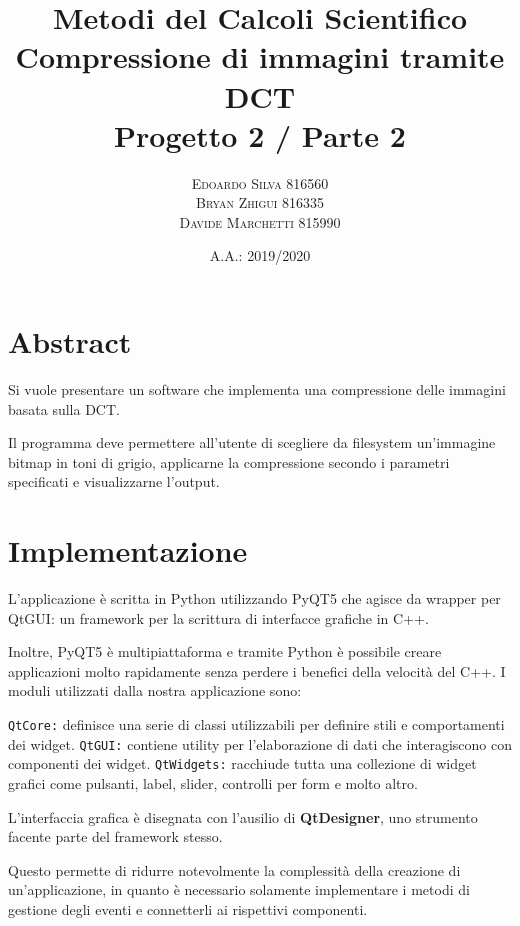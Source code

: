 \documentclass[11pt,italian]{article}
\title{
    Metodi del Calcoli Scientifico \\
    \normalsize Compressione di immagini tramite DCT \\
    \normalsize Progetto 2 / Parte 2
}
\date{A.A.: 2019/2020}
\author{
    \normalsize
    \textsc{Edoardo Silva 816560} \\
    \normalsize
    \textsc{Bryan Zhigui 816335} \\
    \normalsize
    \textsc{Davide Marchetti 815990}
}
\makeatletter
\newcommand*{\lstitem}[1][]{%
  \setbox0\hbox\bgroup
    \patchcmd{\lst@InlineM}{\@empty}{\@empty\egroup\item[\usebox0]\leavevmode\ignorespaces}{}{}%
    \lstinline[#1]%
}
\makeatother
\begin{document}
\maketitle

\section{Abstract}
Si vuole presentare un software che implementa una compressione delle immagini basata sulla DCT.

Il programma deve permettere all'utente di scegliere da filesystem un'immagine bitmap in toni di grigio, applicarne la compressione secondo i parametri specificati e visualizzarne l'output.

\newpage
\section{Implementazione}
L'applicazione è scritta in Python utilizzando PyQT5 che agisce da wrapper per QtGUI: un framework per la scrittura di interfacce grafiche in C++.

Inoltre, PyQT5 è multipiattaforma e tramite Python è possibile creare applicazioni molto rapidamente senza perdere i benefici della velocità del C++.
I moduli utilizzati dalla nostra applicazione sono:
\begin{description}
    \lstitem{QtCore:} definisce una serie di classi utilizzabili per definire stili e comportamenti dei widget.
    \lstitem{QtGUI:} contiene utility per l'elaborazione di dati che interagiscono con componenti dei widget.
    \lstitem{QtWidgets:} racchiude tutta una collezione di widget grafici come pulsanti, label, slider, controlli per form e molto altro.
\end{description}
L'interfaccia grafica è disegnata con l'ausilio di \textbf{QtDesigner}, uno strumento facente parte del framework stesso.

Questo permette di ridurre notevolmente la complessità della creazione di un'applicazione, in quanto è necessario solamente implementare i metodi di gestione degli eventi e connetterli ai rispettivi componenti.

\newpage
\end{document}
